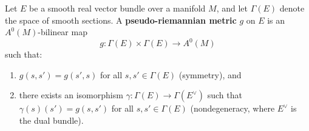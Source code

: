 Let $E$ be a smooth real vector bundle over a manifold $M$, and let $\Gamma(E)$ denote the space of smooth sections. A \textbf{pseudo-riemannian metric} $g$ on $E$ is an $A^0(M)$-bilinear map
$$
g: \Gamma(E) \times \Gamma(E) \to A^0(M)
$$
such that:
\begin{enumerate}
\item $g(s, s') = g(s', s)$ for all $s, s' \in \Gamma(E)$ (symmetry), and
\item there exists an isomorphism $\gamma: \Gamma(E) \to \Gamma(E^\vee)$ such that $\gamma(s)(s') = g(s, s')$ for all $s, s' \in \Gamma(E)$ (nondegeneracy, where $E^\vee$ is the dual bundle).
\end{enumerate}
